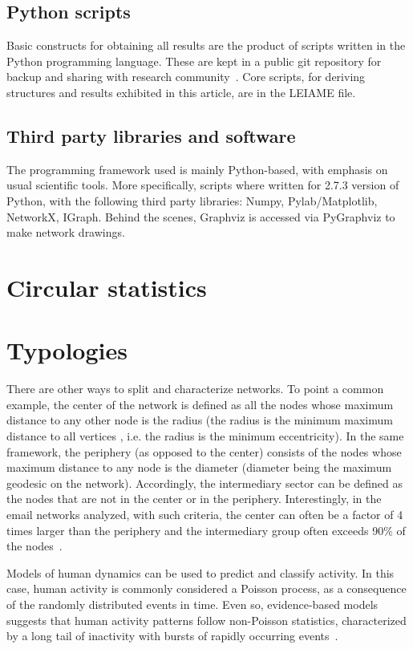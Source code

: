 \documentclass[%
 aip,
 jmp,%
 amsmath,amssymb,
 reprint,%
]{revtex4-1}
\begin{document}
\subsection{Python scripts}\label{ap:os}
Basic constructs for obtaining all results are the product of scripts written in the Python programming language. These are kept in a public git repository for backup and sharing with research community~\cite{scriptsFim}. Core scripts, for deriving structures and results exhibited in this article, are in the LEIAME file.


\subsection{Third party libraries and software}
The programming framework used 
is mainly Python-based, with emphasis on usual
scientific tools. More specifically,
scripts where written for 2.7.3 version of Python,
with the following third party libraries: Numpy, Pylab/Matplotlib, NetworkX, IGraph.
Behind the scenes, Graphviz is accessed via PyGraphviz to make network drawings.
\section{Circular statistics}\label{ap:circular}
\section{Typologies}\label{ap:typ}
There are other ways to split and characterize networks. To point a common example, the center of the network is defined as all the nodes whose maximum distance to any other node is the radius (the radius is the minimum maximum distance to all vertices , i.e. the radius is the minimum eccentricity). 
In the same framework, the periphery (as opposed to the center) consists of the nodes whose maximum distance to any node is the diameter (diameter being the maximum geodesic on the network). Accordingly, the intermediary sector can be defined as the nodes that are not in the center or in the periphery. Interestingly, in the email networks analyzed, with such criteria, the center can often be a factor of 4 times larger than the periphery and the intermediary group often exceeds 90\% of the nodes~\cite{networkx}.

Models of human dynamics can be used to predict and classify activity. In this case, human activity is commonly considered a Poisson process, as a consequence of the randomly distributed events in time. Even so, evidence-based models suggests that human activity patterns follow non-Poisson statistics, characterized by a long tail of inactivity with bursts of rapidly occurring events~\cite{barabasiHumanDyn,barabasiPhone}.
\end{document}
